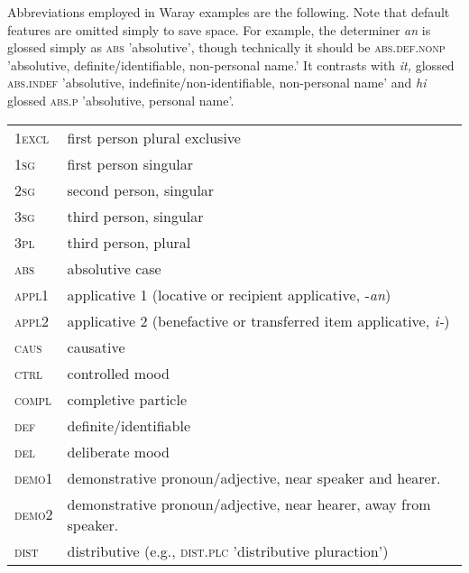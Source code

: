 \documentclass[output=paper]{langscibook}
\begin{document}
Abbreviations employed in Waray examples are the following. Note that default features are omitted simply to save space. For example, the determiner \textit{an} is glossed simply as \textsc{abs} 'absolutive', though technically it should be \textsc{abs.def.nonp} 'absolutive, definite/identifiable, non-personal name.' It contrasts with \textit{it,} glossed \textsc{abs.indef} 'absolutive, indefinite/non-identifiable, non-personal name' and \textit{hi} glossed \textsc{abs.p} 'absolutive, personal name'.

\begin{tabularx}{.45\textwidth}{lQ}
\textsc{1excl} & first person plural exclusive\\

1\textsc{sg} & first person singular\\

2\textsc{sg} & second person, singular\\

\textsc{3sg} & third person, singular\\

3\textsc{pl} &  third person, plural\\

\textsc{abs} & absolutive case\\

\textsc{appl1} & applicative 1 (locative or recipient applicative, -\textit{an})\\

\textsc{appl2} & applicative 2 (benefactive or transferred item applicative, \textit{i-})\\

\textsc{caus} & causative\\

\textsc{ctrl} & controlled mood\\

\textsc{compl} & completive particle\\

\textsc{def} & definite/identifiable\\

\textsc{del} & deliberate mood\\

\textsc{demo1} & demonstrative pronoun/adjective, near speaker and hearer.\\

\textsc{demo2} & demonstrative pronoun/adjective, near hearer, away from speaker.\\
\textsc{dist} & distributive (e.g., \textsc{dist.plc}  'distributive pluraction')\\
\end{tabularx}
\end{document}
